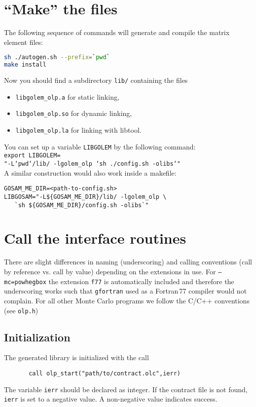 \section{``Make'' the files}
The following sequence of commands will generate and compile the matrix
element files:
\begin{lstlisting}[language=bash]
sh ./autogen.sh --prefix=`pwd`
make install
\end{lstlisting}

Now you should find a subdirectory \texttt{lib/} containing the files
\begin{itemize}
\item \texttt{libgolem\_olp.a} for static linking,
\item \texttt{libgolem\_olp.so} for dynamic linking,
\item \texttt{libgolem\_olp.la} for linking with libtool.
\end{itemize}

You can set up a variable \texttt{LIBGOLEM} by the following command:\\
{\tt export LIBGOLEM=\ }\\
{\tt "-L`pwd`/lib/ -lgolem\_olp `sh ./config.sh -olibs`"}\\
A similar construction would also work inside a makefile:
\begin{lstlisting}[language=Make]
GOSAM_ME_DIR=<path-to-config.sh>
LIBGOSAM="-L${GOSAM_ME_DIR}/lib/ -lgolem_olp \
   `sh ${GOSAM_ME_DIR}/config.sh -olibs`"
\end{lstlisting}

\section{Call the interface routines}
There are slight differences in naming (underscoring) and calling
conventions (call by reference vs. call by value) depending on the
extensions in use. For \texttt{--mc=powhegbox} the extension \texttt{f77}
is automatically included and therefore the underscoring works such that
\texttt{gfortran} used as a Fortran\,77 compiler would not complain.
For all other Monte Carlo programs we follow the C/C++ conventions
(see \texttt{olp.h})

\subsection{Initialization}
The generated \gosam{} library is initialized with the call
\begin{lstlisting}
       call olp_start("path/to/contract.olc",ierr)
\end{lstlisting}
The variable \texttt{ierr} should be declared as integer. If the contract
file is not found, \texttt{ierr} is set to a negative value. A non-negative
value indicates success.

